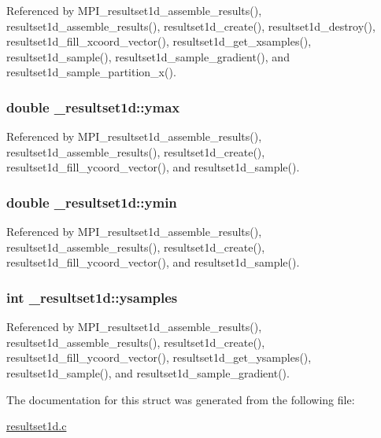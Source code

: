 Referenced by M\+P\+I\+\_\+resultset1d\+\_\+assemble\+\_\+results(), resultset1d\+\_\+assemble\+\_\+results(), resultset1d\+\_\+create(), resultset1d\+\_\+destroy(), resultset1d\+\_\+fill\+\_\+xcoord\+\_\+vector(), resultset1d\+\_\+get\+\_\+xsamples(), resultset1d\+\_\+sample(), resultset1d\+\_\+sample\+\_\+gradient(), and resultset1d\+\_\+sample\+\_\+partition\+\_\+x().

\subsubsection[{\texorpdfstring{ymax}{ymax}}]{\setlength{\rightskip}{0pt plus 5cm}double \+\_\+resultset1d\+::ymax}\hypertarget{struct__resultset1d_a2826260840f94eb40d18cda2e6173de9}{}\label{struct__resultset1d_a2826260840f94eb40d18cda2e6173de9}


Referenced by M\+P\+I\+\_\+resultset1d\+\_\+assemble\+\_\+results(), resultset1d\+\_\+assemble\+\_\+results(), resultset1d\+\_\+create(), resultset1d\+\_\+fill\+\_\+ycoord\+\_\+vector(), and resultset1d\+\_\+sample().

\subsubsection[{\texorpdfstring{ymin}{ymin}}]{\setlength{\rightskip}{0pt plus 5cm}double \+\_\+resultset1d\+::ymin}\hypertarget{struct__resultset1d_a1aa9fced3e7f1101d20756e7958807ab}{}\label{struct__resultset1d_a1aa9fced3e7f1101d20756e7958807ab}


Referenced by M\+P\+I\+\_\+resultset1d\+\_\+assemble\+\_\+results(), resultset1d\+\_\+assemble\+\_\+results(), resultset1d\+\_\+create(), resultset1d\+\_\+fill\+\_\+ycoord\+\_\+vector(), and resultset1d\+\_\+sample().

\subsubsection[{\texorpdfstring{ysamples}{ysamples}}]{\setlength{\rightskip}{0pt plus 5cm}int \+\_\+resultset1d\+::ysamples}\hypertarget{struct__resultset1d_af3d587fe163f90f42a09181e797c2f68}{}\label{struct__resultset1d_af3d587fe163f90f42a09181e797c2f68}


Referenced by M\+P\+I\+\_\+resultset1d\+\_\+assemble\+\_\+results(), resultset1d\+\_\+assemble\+\_\+results(), resultset1d\+\_\+create(), resultset1d\+\_\+fill\+\_\+ycoord\+\_\+vector(), resultset1d\+\_\+get\+\_\+ysamples(), resultset1d\+\_\+sample(), and resultset1d\+\_\+sample\+\_\+gradient().



The documentation for this struct was generated from the following file\+:\begin{DoxyCompactItemize}
\item 
\hyperlink{resultset1d_8c}{resultset1d.\+c}\end{DoxyCompactItemize}
